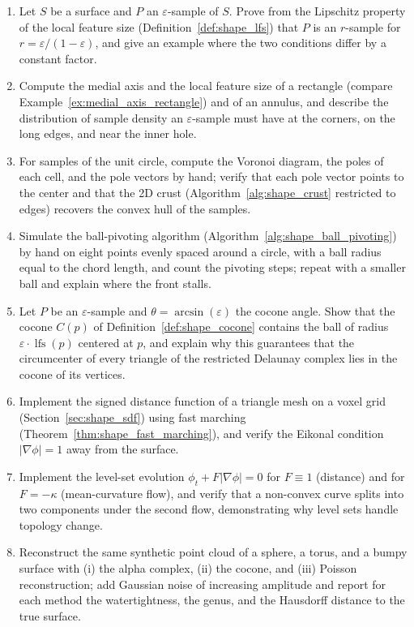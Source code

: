 \begin{enumerate}
  \item Let $S$ be a surface and $P$ an $\varepsilon$-sample of $S$. Prove
    from the Lipschitz property of the local feature size
    (Definition~\ref{def:shape_lfs}) that $P$ is an $r$-sample for
    $r = \varepsilon / (1 - \varepsilon)$, and give an example where the two
    conditions differ by a constant factor.
  \item Compute the medial axis and the local feature size of a rectangle
    (compare Example~\ref{ex:medial_axis_rectangle}) and of an annulus, and
    describe the distribution of sample density an $\varepsilon$-sample must
    have at the corners, on the long edges, and near the inner hole.
  \item For samples of the unit circle, compute the Voronoi diagram, the poles
    of each cell, and the pole vectors by hand; verify that each pole vector
    points to the center and that the 2D crust
    (Algorithm~\ref{alg:shape_crust} restricted to edges) recovers the convex
    hull of the samples.
  \item Simulate the ball-pivoting algorithm (Algorithm~\ref{alg:shape_ball_pivoting})
    by hand on eight points evenly spaced around a circle, with a ball radius
    equal to the chord length, and count the pivoting steps; repeat with a
    smaller ball and explain where the front stalls.
  \item Let $P$ be an $\varepsilon$-sample and $\theta = \arcsin(\varepsilon)$
    the cocone angle. Show that the cocone $C(p)$ of
    Definition~\ref{def:shape_cocone} contains the ball of radius
    $\varepsilon \cdot \operatorname{lfs}(p)$ centered at $p$, and explain why
    this guarantees that the circumcenter of every triangle of the restricted
    Delaunay complex lies in the cocone of its vertices.
  \item Implement the signed distance function of a triangle mesh on a voxel
    grid (Section~\ref{sec:shape_sdf}) using fast marching
    (Theorem~\ref{thm:shape_fast_marching}), and verify the Eikonal condition
    $|\nabla \phi| = 1$ away from the surface.
  \item Implement the level-set evolution $\phi_t + F|\nabla \phi| = 0$ for
    $F \equiv 1$ (distance) and for $F = -\kappa$ (mean-curvature flow), and
    verify that a non-convex curve splits into two components under the second
    flow, demonstrating why level sets handle topology change.
  \item Reconstruct the same synthetic point cloud of a sphere, a torus, and a
    bumpy surface with (i) the alpha complex, (ii) the cocone, and (iii)
    Poisson reconstruction; add Gaussian noise of increasing amplitude and
    report for each method the watertightness, the genus, and the Hausdorff
    distance to the true surface.
\end{enumerate}
